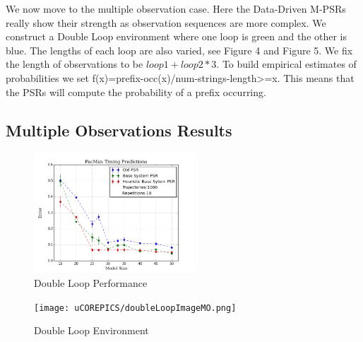 We now move to the multiple observation case. Here the Data-Driven M-PSRs really show their strength as observation sequences are more complex. We construct a Double Loop environment where one loop is green and the other is blue. The lengths of each loop are also varied, see Figure 4 and Figure 5. We fix the length of observations to be $loop1 + loop2 * 3$. To build empirical estimates of probabilities we set f(x)=prefix-occ(x)/num-strings-length>=x. This means that the PSRs will compute the probability of a prefix occurring.

\subsection{Multiple Observations Results}

\begin{figure}[ht!]
\centering
\includegraphics[width=60mm]{uCOREPICS/PacManTimingHeuristicsIncluded.png}
\caption{Double Loop Performance\label{overflow}}
\end{figure}

\begin{figure}[ht!]
\centering
\texttt{[image: uCOREPICS/doubleLoopImageMO.png]}
\caption{Double Loop Environment\label{overflow}}
\end{figure}
